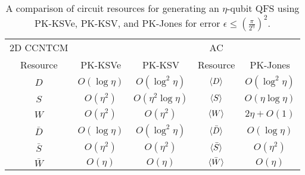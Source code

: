 \begin{table}[hbt!]
\begin{center}
\begin{tabular}{|c|c|c|c|c|}
\hline
\textsf{2D CCNTCM} &         &                          & \textsf{AC}     & \\
Resource  & PK-KSVe          & PK-KSV                   & Resource        & PK-Jones\\
\hline
$D$       & $O(\log {\eta})$ & $O(\log^2 {\eta})$       & $\langle D \rangle$       & $O(\log^2 {\eta})$ \\
$S$       & $O({\eta}^2)$    & $O({\eta}^2\log {\eta})$ & $\langle S \rangle$       & $O({\eta} \log {\eta})$ \\
$W$       & $O({\eta}^2)$    & $O({\eta}^2)$            & $\langle W \rangle$       & $2\eta + O(1)$ \\
$\bar{D}$ & $O(\log {\eta})$ & $O(\log^2 {\eta})$       & $\langle \bar{D} \rangle$ & $O(\log {\eta})$ \\
$\bar{S}$ & $O({\eta}^2)$    & $O({\eta}^2)$            & $\langle \bar{S} \rangle$ & $O({\eta}^2)$ \\
$\bar{W}$ & $O({\eta})$      & $O({\eta})$              & $\langle \bar{W} \rangle$ & $O({\eta})$ \\
\hline
\end{tabular}
\caption{A comparison of circuit resources for generating an $\eta$-qubit QFS using PK-KSVe, PK-KSV, and PK-Jones for error $\epsilon \le \left( \frac{\pi}{2^{\eta}} \right)^2$.}
\label{tab:ksv-resources}
\end{center}
\end{table}